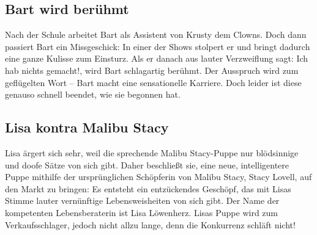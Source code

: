 	
\subsection{Bart wird berühmt}\label{1F11}
Nach der Schule arbeitet Bart als Assistent von Krusty dem Clowns. Doch dann passiert Bart ein Missgeschick: In einer der Shows stolpert er und bringt dadurch eine ganze Kulisse zum Einsturz. Als er danach aus lauter Verzweiflung sagt: \glqq Ich hab nichts gemacht!\grqq , wird Bart schlagartig berühmt. Der Ausspruch wird zum geflügelten Wort -- Bart macht eine sensationelle Karriere. Doch leider ist diese genauso schnell beendet, wie sie begonnen hat.


	
\subsection{Lisa kontra Malibu Stacy}\label{1F12}
Lisa ärgert sich sehr, weil die sprechende \glqq Malibu Stacy\grqq -Puppe nur blödsinnige und doofe Sätze von sich gibt. Daher beschließt sie, eine neue, intelligentere Puppe mithilfe der ursprünglichen Schöpferin von Malibu Stacy, Stacy Lovell, auf den Markt zu bringen: Es entsteht ein ent\-zück\-en\-des Geschöpf, das mit Lisas Stimme lauter vernünftige Lebensweisheiten von sich gibt. Der Name der kompetenten Lebensberaterin ist Lisa Löwenherz. Lisas Puppe wird zum Verkaufsschlager, jedoch nicht allzu lange, denn die Konkurrenz schläft nicht!


